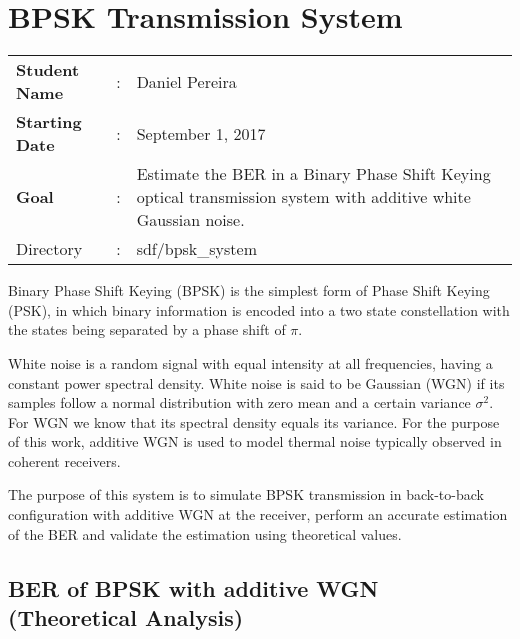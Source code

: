 \clearpage
\section{BPSK Transmission System}

\begin{tcolorbox}	
\begin{tabular}{p{2.75cm} p{0.2cm} p{10.5cm}} 	
\textbf{Student Name}  &:& Daniel Pereira\\
\textbf{Starting Date} &:& September 1, 2017\\
\textbf{Goal}          &:& Estimate the BER in a Binary Phase Shift Keying optical transmission system with additive white Gaussian noise.\\
Directory              &:& sdf/bpsk\_system  
\end{tabular}
\end{tcolorbox}

Binary Phase Shift Keying (BPSK) is the simplest form of Phase Shift Keying (PSK), in which binary information is encoded into a two state constellation with the states being separated by a phase shift of $\pi$.
\par
White noise is a random signal with equal intensity at all frequencies, having a constant power spectral density. White noise is said to be Gaussian (WGN) if its samples follow a normal distribution with zero mean and a certain variance $\sigma^2$. For WGN we know that its spectral density equals its variance. For the purpose of this work, additive WGN is used to model thermal noise typically observed in coherent receivers.
\par
The purpose of this system is to simulate BPSK transmission in back-to-back configuration with additive WGN at the receiver, perform an accurate estimation of the BER and validate the estimation using theoretical values.

\subsection{BER of BPSK with additive WGN (Theoretical Analysis)}

